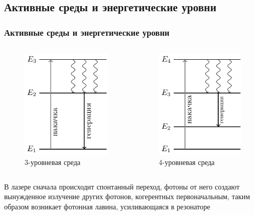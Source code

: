 \documentclass[10pt,pdf,hyperref={unicode}, dvipsnames]{beamer}
\newcommand\frametitless[1]{\subsection{#1}\frametitle{#1}}
\begin{document}
\begin{frame}[t]
	\frametitless{Активные среды и энергетические уровни}

	\begin{columns}
		\begin{column}{0.49\textwidth}
			\begin{figure}[h]
				\centering
				\includegraphics[]{images/3nd}
				\caption{3-уровневая среда}
			\end{figure}	
		\end{column}
		\begin{column}{0.49\textwidth}
			\begin{figure}[h]
				\centering
				\includegraphics[]{images/4nd}
				\caption{4-уровневая среда}
			\end{figure}	
		\end{column}
	\end{columns}
	\vspace{1em}
	В лазере сначала происходит спонтанный переход, фотоны от него создают вынужденное излучение других фотонов, когерентных первоначальным, таким образом возникает фотонная лавина, усиливающаяся в резонаторе

\end{frame}
\end{document}
